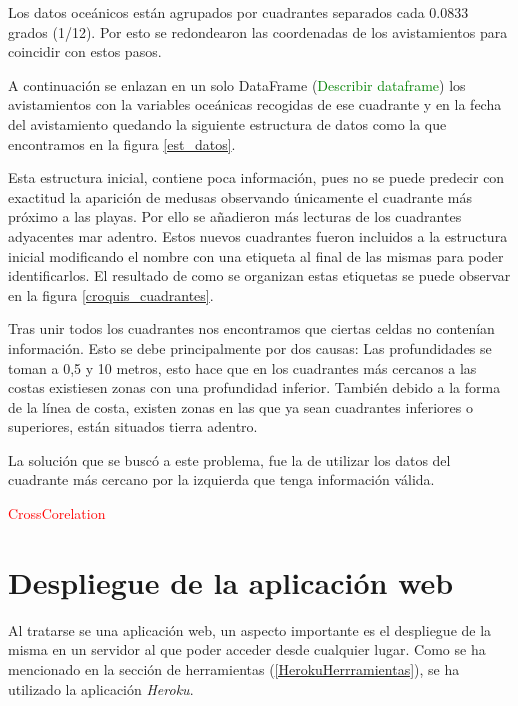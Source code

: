 Los datos oceánicos están agrupados por cuadrantes separados cada \num{0,0833}  grados (1/12). Por esto se redondearon las coordenadas de los avistamientos para coincidir con estos pasos. 

A continuación se enlazan en un solo DataFrame (\textcolor{green}{Describir dataframe}) los avistamientos con la variables oceánicas recogidas de ese cuadrante y en la fecha del avistamiento quedando la siguiente estructura de datos como la que encontramos en la figura \ref{est_datos}.

\label{est_datos}

Esta estructura inicial, contiene poca información, pues no se puede predecir con exactitud la aparición de medusas observando únicamente el cuadrante más próximo a las playas. Por ello se añadieron más lecturas de los cuadrantes adyacentes mar adentro. Estos nuevos cuadrantes fueron incluidos a la estructura inicial modificando el nombre con una etiqueta al final de las mismas para poder identificarlos. El resultado de como se organizan estas etiquetas se puede observar en la figura \ref{croquis_cuadrantes}.

\label{croquis_cuadrantes}

Tras unir todos los cuadrantes nos encontramos que ciertas celdas no contenían información. Esto se debe principalmente por dos causas: Las profundidades se toman a 0,5 y 10 metros, esto hace que en los cuadrantes más cercanos a las costas existiesen zonas con una profundidad inferior. También debido a la forma de la línea de costa, existen zonas en las que ya sean cuadrantes inferiores o superiores, están situados tierra adentro.

La solución que se buscó a este problema, fue la de utilizar los datos del cuadrante más cercano por la izquierda que tenga información válida.

\textcolor{red}{CrossCorelation}

\section{Despliegue de la aplicación web}
Al tratarse se una aplicación web, un aspecto importante es el despliegue de la misma en un servidor al que poder acceder desde cualquier lugar. Como se ha mencionado en la sección de herramientas (\ref{HerokuHerrramientas}), se ha utilizado la aplicación \emph{Heroku}.

